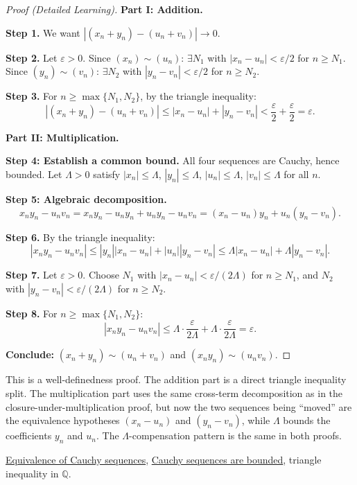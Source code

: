 \begin{proof}[Proof (Detailed Learning)]
\textbf{Part I: Addition.}

\textbf{Step 1.}  We want $|(x_n+y_n)-(u_n+v_n)| \to 0$.

\textbf{Step 2.}  Let $\varepsilon > 0$.  Since $(x_n) \sim (u_n)$:
$\exists N_1$ with $|x_n - u_n| < \varepsilon/2$ for $n \geq N_1$.
Since $(y_n) \sim (v_n)$: $\exists N_2$ with $|y_n - v_n| < \varepsilon/2$
for $n \geq N_2$.

\textbf{Step 3.}  For $n \geq \max\{N_1, N_2\}$, by the triangle inequality:
\[
|(x_n+y_n)-(u_n+v_n)|
\leq |x_n-u_n| + |y_n-v_n|
< \frac{\varepsilon}{2}+\frac{\varepsilon}{2} = \varepsilon.
\]

\textbf{Part II: Multiplication.}

\textbf{Step 4: Establish a common bound.}
All four sequences are Cauchy, hence bounded.
Let $\Lambda > 0$ satisfy $|x_n| \leq \Lambda$, $|y_n| \leq \Lambda$,
$|u_n| \leq \Lambda$, $|v_n| \leq \Lambda$ for all $n$.

\textbf{Step 5: Algebraic decomposition.}
\[
x_n y_n - u_n v_n
= x_n y_n - u_n y_n + u_n y_n - u_n v_n
= (x_n - u_n)y_n + u_n(y_n - v_n).
\]

\textbf{Step 6.}  By the triangle inequality:
\[
|x_n y_n - u_n v_n|
\leq |y_n||x_n - u_n| + |u_n||y_n - v_n|
\leq \Lambda|x_n - u_n| + \Lambda|y_n - v_n|.
\]

\textbf{Step 7.}  Let $\varepsilon > 0$.  Choose $N_1$ with
$|x_n - u_n| < \varepsilon/(2\Lambda)$ for $n \geq N_1$, and $N_2$ with
$|y_n - v_n| < \varepsilon/(2\Lambda)$ for $n \geq N_2$.

\textbf{Step 8.}  For $n \geq \max\{N_1, N_2\}$:
\[
|x_n y_n - u_n v_n|
\leq \Lambda \cdot \frac{\varepsilon}{2\Lambda} + \Lambda \cdot \frac{\varepsilon}{2\Lambda}
= \varepsilon.
\]

\textbf{Conclude:} $(x_n+y_n) \sim (u_n+v_n)$ and $(x_n y_n) \sim (u_n v_n)$.
\end{proof}

\begin{remark*}
This is a well-definedness proof.  The addition part is a direct triangle
inequality split.  The multiplication part uses the same cross-term
decomposition as in the closure-under-multiplication proof, but now the
two sequences being ``moved'' are the equivalence hypotheses $(x_n - u_n)$
and $(y_n - v_n)$, while $\Lambda$ bounds the coefficients $y_n$ and $u_n$.
The $\Lambda$-compensation pattern is the same in both proofs.
\end{remark*}

\begin{dependencies}
\hyperref[def:cauchy-equivalence]{Equivalence of Cauchy sequences},
\hyperref[thm:cauchy-bounded-q]{Cauchy sequences are bounded},
triangle inequality in $\mathbb{Q}$.
\end{dependencies}
